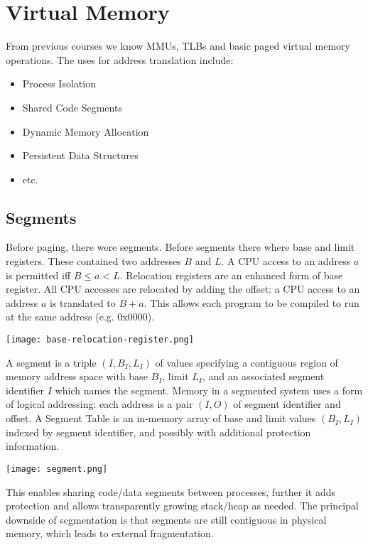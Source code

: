 \section{Virtual Memory}

From previous courses we know MMUs, TLBs and basic paged virtual memory operations. The uses for address translation include:
\begin{itemize}
	\item Process Isolation
	\item Shared Code Segments
	\item Dynamic Memory Allocation
	\item Persistent Data Structures
	\item etc.
\end{itemize}


\subsection{Segments}

Before paging, there were segments. Before segments there where base and limit registers. These contained two addresses $B$ and $L$. A CPU access to an address $a$ is permitted iff $B \leq a < L$. Relocation registers are an enhanced form of base register. All CPU accesses are relocated by adding the offset: a CPU access to an address $a$ is translated to $B + a$. This allows each program to be compiled to run at the same address (e.g. 0x0000). \medskip
\begin{center}
	\texttt{[image: base-relocation-register.png]}
\end{center}

A segment is a triple $(I, B_I, L_I)$ of values specifying a contiguous region of memory address space with base $B_I$, limit $L_I$, and an associated segment identifier $I$ which names the segment. Memory in a segmented system uses a form of logical addressing: each address is a pair $(I, O)$ of segment identifier and offset. A Segment Table is an in-memory array of base and limit values $(B_I, L_I)$ indexed by segment identifier, and possibly with additional protection information.
\begin{center}
	\texttt{[image: segment.png]}
\end{center}

This enables sharing code/data segments between processes, further it adds protection and allows transparently growing stack/heap as needed. The principal downside of segmentation is that segments are still contiguous in physical memory, which leads to external fragmentation.


